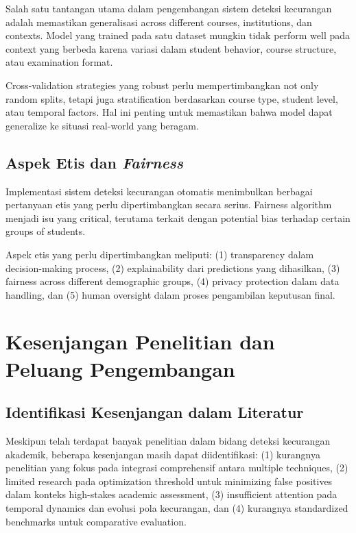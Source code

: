 Salah satu tantangan utama dalam pengembangan sistem deteksi kecurangan adalah memastikan generalisasi across different courses, institutions, dan contexts. Model yang trained pada satu dataset mungkin tidak perform well pada context yang berbeda karena variasi dalam student behavior, course structure, atau examination format.

Cross-validation strategies yang robust perlu mempertimbangkan not only random splits, tetapi juga stratification berdasarkan course type, student level, atau temporal factors. Hal ini penting untuk memastikan bahwa model dapat generalize ke situasi real-world yang beragam.

\subsection{Aspek Etis dan \textit{Fairness}}

Implementasi sistem deteksi kecurangan otomatis menimbulkan berbagai pertanyaan etis yang perlu dipertimbangkan secara serius. Fairness algorithm menjadi isu yang critical, terutama terkait dengan potential bias terhadap certain groups of students.

Aspek etis yang perlu dipertimbangkan meliputi: (1) transparency dalam decision-making process, (2) explainability dari predictions yang dihasilkan, (3) fairness across different demographic groups, (4) privacy protection dalam data handling, dan (5) human oversight dalam proses pengambilan keputusan final.

\section{Kesenjangan Penelitian dan Peluang Pengembangan}
\label{sec:researchGaps}

\subsection{Identifikasi Kesenjangan dalam Literatur}

Meskipun telah terdapat banyak penelitian dalam bidang deteksi kecurangan akademik, beberapa kesenjangan masih dapat diidentifikasi: (1) kurangnya penelitian yang fokus pada integrasi comprehensif antara multiple techniques, (2) limited research pada optimization threshold untuk minimizing false positives dalam konteks high-stakes academic assessment, (3) insufficient attention pada temporal dynamics dan evolusi pola kecurangan, dan (4) kurangnya standardized benchmarks untuk comparative evaluation.

